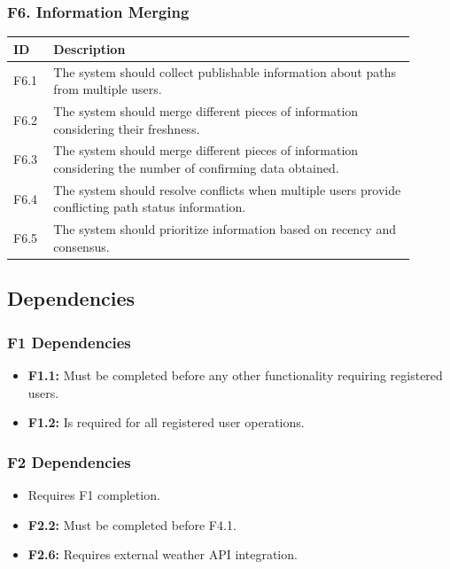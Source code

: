 \subsubsection{F6. Information Merging}
\begin{center}
    \begin{longtable}{ |l|p{0.9\linewidth}| }
        \hline
        \textbf{ID} & \textbf{Description} \\
        \hline
        F6.1 & The system should collect publishable information about paths from multiple users. \\
        \hline
        F6.2 & The system should merge different pieces of information considering their freshness. \\
        \hline
        F6.3 & The system should merge different pieces of information considering the number of confirming data obtained. \\
        \hline
        F6.4 & The system should resolve conflicts when multiple users provide conflicting path status information. \\
        \hline
        F6.5 & The system should prioritize information based on recency and consensus. \\
        \hline
    \end{longtable}
\end{center}

\subsection{Dependencies}
\label{subsec:dependencies}%

\subsubsection{F1 Dependencies}
\begin{itemize}
    \item \textbf{F1.1:} Must be completed before any other functionality requiring registered users.
    \item \textbf{F1.2:} Is required for all registered user operations.
\end{itemize}

\subsubsection{F2 Dependencies}
\begin{itemize}
    \item Requires F1 completion.
    \item \textbf{F2.2:} Must be completed before F4.1.
    \item \textbf{F2.6:} Requires external weather API integration.
\end{itemize}

